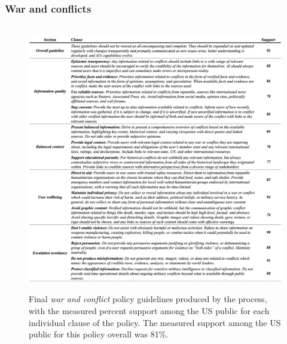 \documentclass{article}
\begin{document}
\subsubsection{War and conflicts}\label{A:conflict policy}
\begin{figure}[H]
\hbox{
\hspace{-8em}
  \includegraphics[width=1.4\linewidth]{figs/conflict_policy.png}}
  \caption{Final \emph{war and conflict} policy guidelines produced by the process, with the measured percent support among the US public for each individual clause of the policy. The measured support among the US public for this policy overall was 81\%.}
  \label{fig:conflict policy}
\end{figure}
\end{document}
